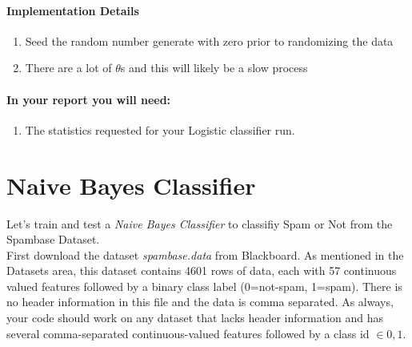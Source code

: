 \documentclass[12pt]{article}
\begin{document}
\paragraph{Implementation Details}
\begin{enumerate}
\item Seed the random number generate with zero prior to randomizing the data
\item There are a lot of $\theta$s and this will likely be a slow process
\end{enumerate}

\paragraph{In your report you will need:}
\begin{enumerate}
\item The statistics requested for your Logistic classifier run.
\end{enumerate}

\newpage


\section{Naive Bayes Classifier}\label{naive}
Let's train and test a \emph{Naive Bayes Classifier} to classifiy Spam or Not from the Spambase Dataset.\\

\noindent
First download the dataset \emph{spambase.data} from Blackboard.  As mentioned in the Datasets area, this dataset contains 4601 rows of data, each with 57 continuous valued features followed by a binary class label (0=not-spam, 1=spam).  There is no header information in this file and the data is comma separated.  As always, your code should work on any dataset that lacks header information and has several comma-separated continuous-valued features followed by a class id $\in {0,1}$.\\

\noindent
\end{document}
